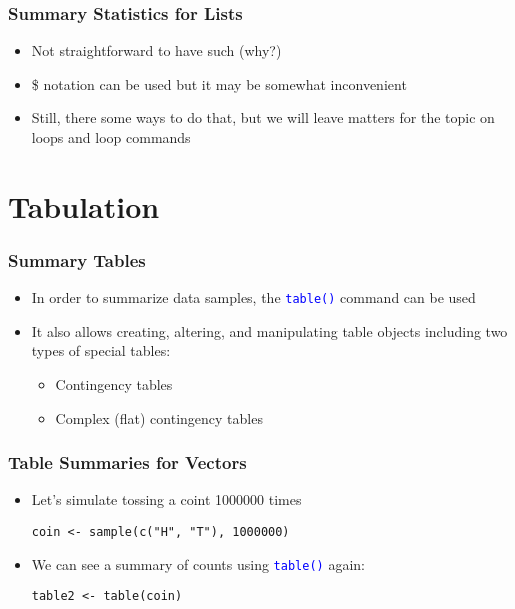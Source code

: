 \documentclass[10pt]{beamer}
\newcommand{\cc}[1]{\texttt{\textcolor{blue}{#1}}}
\theoremstyle{definition}
\begin{document}
\begin{frame}[fragile]
\frametitle{Summary Statistics for Lists}
\begin{itemize}
	\item Not straightforward to have such ({why?})
	
	\item \$ notation can be used but it may be somewhat inconvenient
	
	\item Still, there some ways to do that, but we will leave matters for the topic on loops and loop commands
\end{itemize}
\end{frame}

\section{Tabulation}
\begin{frame}[fragile]
\frametitle{Summary Tables}
\begin{itemize}
	\item In order to summarize data samples, the \cc{table()} command can be used
	
	\item It also allows creating, altering, and manipulating table objects including two types of special tables:
	\begin{itemize}
  	  \item Contingency tables
  	  \item Complex (flat) contingency tables
    \end{itemize}
\end{itemize}
\end{frame}

\begin{frame}[fragile]
\frametitle{Table Summaries for Vectors}
\begin{itemize}
	\item Let's simulate tossing a coint 1000000 times
	\begin{lstlisting}[style = rstyle, breaklines]
	coin <- sample(c("H", "T"), 1000000)
	\end{lstlisting}
	
	\item We can see a summary of counts using \cc{table()} again:
	\begin{lstlisting}[style = rstyle, breaklines]
	table2 <- table(coin)
	\end{lstlisting}
\end{itemize}
\end{frame}
\end{document}
